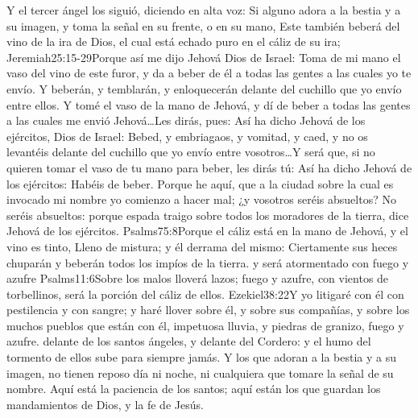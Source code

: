 Y el tercer ángel los siguió, diciendo en alta voz: Si alguno adora a la bestia y a su imagen, y toma la señal en su frente, o en su mano, 
Este también beberá del vino de la ira de Dios, el cual está echado puro en el cáliz de su ira;%
				   {Jeremiah}{25:15-29}{Porque así me dijo Jehová Dios de Israel: Toma de mi mano el vaso del vino de este furor, y da a beber de él a todas las gentes a las cuales yo te envío. Y beberán, y temblarán, y enloquecerán delante del cuchillo que yo envío entre ellos. Y tomé el vaso de la mano de Jehová, y dí de beber a todas las gentes a las cuales me envió Jehová\ldots Les dirás, pues: Así ha dicho Jehová de los ejércitos, Dios de Israel: Bebed, y embriagaos, y vomitad, y caed, y no os levantéis delante del cuchillo que yo envío entre vosotros\ldots Y será que, si no quieren tomar el vaso de tu mano para beber, les dirás tú: Así ha dicho Jehová de los ejércitos: Habéis de beber. Porque he aquí, que a la ciudad sobre la cual es invocado mi nombre yo comienzo a hacer mal; ¿y vosotros seréis absueltos? No seréis absueltos: porque espada traigo sobre todos los moradores de la tierra, dice Jehová de los ejércitos.}%
				   {Psalms}{75:8}{Porque el cáliz está en la mano de Jehová, y el vino es tinto, Lleno de mistura; y él derrama del mismo: Ciertamente sus heces chuparán y beberán todos los impíos de la tierra.}
 y será atormentado con fuego y azufre%
					{Psalms}{11:6}{Sobre los malos lloverá lazos; fuego y azufre, con vientos de torbellinos, será la porción del cáliz de ellos.}%
					{Ezekiel}{38:22}{Y yo litigaré con él con pestilencia y con sangre; y haré llover sobre él, y sobre sus compañías, y sobre los muchos pueblos que están con él, impetuosa lluvia, y piedras de granizo, fuego y azufre.}%
 delante de los santos ángeles, y delante del Cordero: 
y el humo del tormento de ellos sube para siempre jamás.%
 Y los que adoran a la bestia y a su imagen, no tienen reposo día ni noche,%
 ni cualquiera que tomare la señal de su nombre. 
Aquí está la paciencia de los santos; aquí están los que guardan los mandamientos de Dios, y la fe de Jesús.

